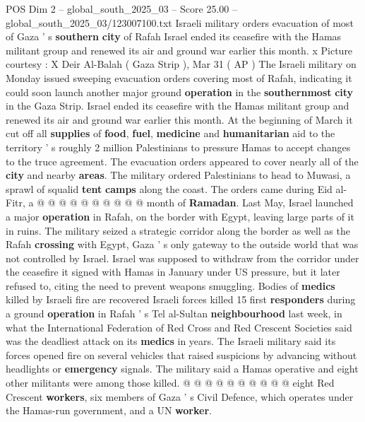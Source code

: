 \begin{textsample}{POS Dim 2 – global\_south\_2025\_03 – Score 25.00 – global\_south\_2025\_03/123007100.txt}  \label{ex:f2_pos_303}
Israeli military orders evacuation of most of Gaza ' s \textbf{southern} \textbf{city} of Rafah Israel ended its ceasefire with the Hamas militant group and renewed its air and ground war earlier this month. x Picture courtesy : X Deir Al-Balah ( Gaza Strip ), Mar 31 ( AP ) The Israeli military on Monday issued sweeping evacuation orders covering most of Rafah, indicating it could soon launch another major ground \textbf{operation} in the \textbf{southernmost} \textbf{city} in the Gaza Strip.
Israel ended its ceasefire with the Hamas militant group and renewed its air and ground war earlier this month.
At the beginning of March it cut off all \textbf{supplies} of \textbf{food}, \textbf{fuel}, \textbf{medicine} and \textbf{humanitarian} aid to the territory ' s roughly 2 million Palestinians to pressure Hamas to accept changes to the truce agreement.
The evacuation orders appeared to cover nearly all of the \textbf{city} and nearby \textbf{areas}.
The military ordered Palestinians to head to Muwasi, a sprawl of squalid \textbf{tent} \textbf{camps} along the coast.
The orders came during Eid al-Fitr, a @ @ @ @ @ @ @ @ @ @ month of \textbf{Ramadan}.
Last May, Israel launched a major \textbf{operation} in Rafah, on the border with Egypt, leaving large parts of it in ruins.
The military seized a strategic corridor along the border as well as the Rafah \textbf{crossing} with Egypt, Gaza ' s only gateway to the outside world that was not controlled by Israel.
Israel was supposed to withdraw from the corridor under the ceasefire it signed with Hamas in January under US pressure, but it later refused to, citing the need to prevent weapons smuggling.
Bodies of \textbf{medics} killed by Israeli fire are recovered Israeli forces killed 15 first \textbf{responders} during a ground \textbf{operation} in Rafah ' s Tel al-Sultan \textbf{neighbourhood} last week, in what the International Federation of Red Cross and Red Crescent Societies said was the deadliest attack on its \textbf{medics} in years.
The Israeli military said its forces opened fire on several vehicles that raised suspicions by advancing without headlights or \textbf{emergency} signals.
The military said a Hamas operative and eight other militants were among those killed. @ @ @ @ @ @ @ @ @ @ eight Red Crescent \textbf{workers}, six members of Gaza ' s Civil Defence, which operates under the Hamas-run government, and a UN \textbf{worker}.

\end{textsample}
